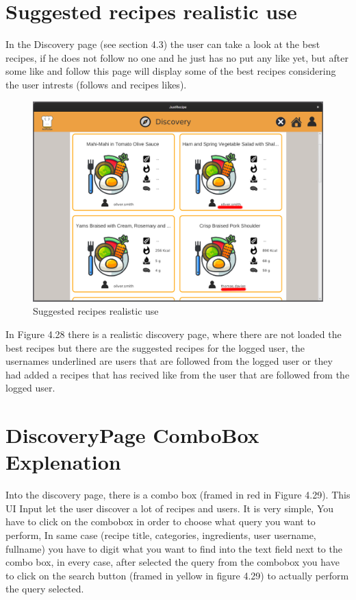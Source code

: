\documentclass[a4paper]{report}
\begin{document}
\section{Suggested recipes realistic use}
In the Discovery page (see section 4.3) the user can take a look at the best recipes, if he does not follow no one and he just has no put any like yet, but after some like and follow this page will display some of the best recipes considering the user intrests (follows and recipes likes).
\begin{figure}[htpb]
	\centering
	\includegraphics[scale=0.37]{img/user_manual/properDiscoveryPage.png}
	\caption{Suggested recipes realistic use}
\end{figure}
In Figure 4.28 there is a realistic discovery page, where there are not loaded the best recipes but there are the suggested recipes for the logged user, the usernames underlined are users that are followed from the logged user or they had added a recipes that has recived like from the user that are followed from the logged user.

\section{DiscoveryPage ComboBox Explenation}
Into the discovery page, there is a combo box (framed in red in Figure 4.29).
This UI Input let the user discover a lot of recipes and users. It is very simple, You have to click on the combobox in order to choose what query you want to perform, In same case (recipe title, categories, ingredients, user username, fullname) you have to digit what you want to find into the text field next to the combo box, in every case, after selected the query from the combobox you have to click on the search button (framed in yellow in figure 4.29) to actually perform the query selected.
\end{document}
